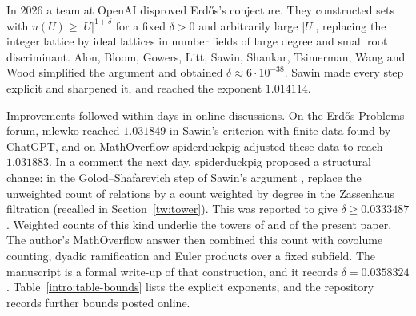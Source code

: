 \documentclass[11pt]{amsart}
\numberwithin{equation}{section}
\theoremstyle{definition}
\theoremstyle{remark}
\begin{document}
In $2026$ a team at OpenAI \cite{OpenAI2026} disproved Erd\H{o}s's
conjecture. They constructed sets with $u(U)\ge|U|^{1+\delta}$ for a
fixed $\delta>0$ and arbitrarily large $|U|$, replacing the integer
lattice by ideal lattices in number fields of large degree and small
root discriminant. Alon, Bloom, Gowers, Litt, Sawin, Shankar, Tsimerman,
Wang and Wood \cite{Alon2026} simplified the argument and obtained
$\delta\approx6\cdot10^{-38}$. Sawin \cite{Sawin2026} made every step
explicit and sharpened it, and reached the exponent $1.014114$.

Improvements followed within days in online discussions. On the
Erd\H{o}s Problems forum, mlewko \cite{ErdosProblems90} reached
$1.031849$ in Sawin's criterion with finite data found by ChatGPT, and
on MathOverflow spiderduckpig \cite{SpiderduckpigMO2026} adjusted these
data to reach $1.031883$. In a comment the next day, spiderduckpig
proposed a structural change: in the Golod--Shafarevich step of Sawin's
argument \cite[Lemma~11]{Sawin2026}, replace the unweighted count of
relations by a count weighted by degree in the Zassenhaus filtration
(recalled in Section~\ref{tw:tower}). This was reported to give $\delta\ge0.0333487$
\cite{SpiderduckpigMO2026}. Weighted counts of this kind underlie the
towers of \cite{Naslund0358} and of the present paper. The author's
MathOverflow answer \cite{NaslundMO2026} then combined this count with
covolume counting, dyadic ramification and Euler products over a fixed
subfield. The manuscript \cite{Naslund0358} is a formal write-up of that
construction, and it records $\delta=0.0358324$.
Table~\ref{intro:table-bounds} lists the explicit exponents, and the
repository \cite{TaoConstants84a} records further bounds posted online.
\end{document}
